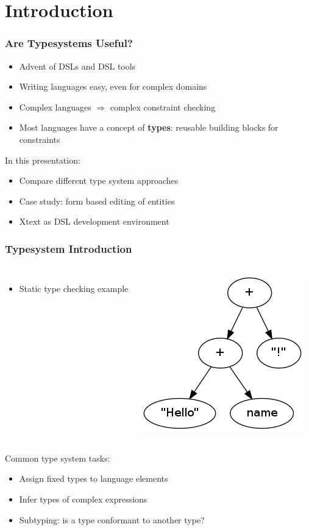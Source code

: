 \def \typIntro {Typesystem Introduction}
\section{Introduction}

\begin{frame}
  \frametitle{Are Typesystems Useful?}
  
  \begin{itemize}
    \item Advent of DSLs and DSL tools
    \item Writing languages easy, even for complex domains
    \item Complex languages $\Rightarrow$ complex constraint checking
    \item Most languages have a concept of \textbf{types}: reusable building
    blocks for constraints
  \end{itemize}
  
  \pause
  In this presentation:
  \begin{itemize}
    \item Compare different type system approaches
    \item Case study: form based editing of entities
    \item Xtext as DSL development environment
  \end{itemize}
\end{frame}

\begin{frame}[fragile]
  \frametitle{\typIntro}
  \begin{columns}[T]
        \begin{itemize}
    \item Static type checking example
        \end{itemize}
        
        \includegraphics[scale=0.45]{img/ast1.png}
  \end{columns}
  \pause
  Common type system tasks:

  \begin{itemize}
    \item Assign fixed types to language elements
    \item Infer types of complex expressions
    \item Subtyping: is a type conformant to another type?
  \end{itemize}
\end{frame}